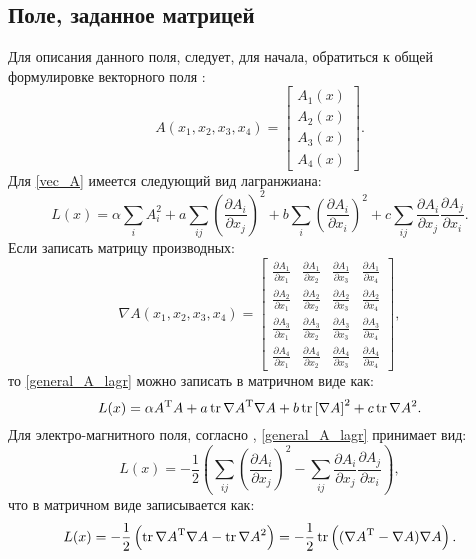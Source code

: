 \subsection{Поле, заданное матрицей}
Для описания данного поля, следует, для начала, обратиться к общей формулировке векторного поля \cite{field_theory}:
\begin{equation}
	A(x_1, x_2, x_3, x_4) = \begin{bmatrix} A_1(x) \\ A_2(x) \\ A_3(x) \\ A_4(x) \end{bmatrix}.
	\label{vec_A}
\end{equation}
Для \ref{vec_A} имеется следующий вид лагранжиана:
\begin{equation}
	L(x) = \alpha\sum_{i}A^2_i + a\sum_{ij}{\left(\frac{\partial A_i}{\partial x_j}\right)}^2 + b\sum_{i}{\left(\frac{\partial A_i}{\partial x_i}\right)}^2 + c\sum_{ij}\frac{\partial A_i}{\partial x_j}\frac{\partial A_j}{\partial x_i}. 
	\label{general_A_lagr}
\end{equation}
Если записать матрицу производных:
\begin{equation}
	\nabla A(x_1, x_2, x_3, x_4) = \begin{bmatrix}
	\frac{\partial A_1}{\partial x_1} & \frac{\partial A_1}{\partial x_2} & \frac{\partial A_1}{\partial x_3} & \frac{\partial A_1}{\partial x_4} \\
	\frac{\partial A_2}{\partial x_1} & \frac{\partial A_2}{\partial x_2} & \frac{\partial A_2}{\partial x_3} & \frac{\partial A_2}{\partial x_4} \\
	\frac{\partial A_3}{\partial x_1} & \frac{\partial A_3}{\partial x_2} & \frac{\partial A_3}{\partial x_3} & \frac{\partial A_3}{\partial x_4} \\
	\frac{\partial A_4}{\partial x_1} & \frac{\partial A_4}{\partial x_2} & \frac{\partial A_4}{\partial x_3} & \frac{\partial A_4}{\partial x_4}
 \end{bmatrix},
	\label{dA}
\end{equation}
то \ref{general_A_lagr} можно записать в матричном виде как:
\begin{equation}
	L(x) = \alpha A^\mathrm{T}A + a\operatorname{tr}{\nabla A}^\mathrm{T}\nabla A + b\operatorname{tr}{\left[\nabla A\right]}^2 + c\operatorname{tr}{\nabla A}^2.
	\label{mtrx_A_lagr}
\end{equation}
Для электро-магнитного поля, согласно \cite{field_theory}, \ref{general_A_lagr} принимает вид:
\begin{equation}
	L(x) = -\frac{1}{2}\left(\sum_{ij}{\left(\frac{\partial A_i}{\partial x_j}\right)}^2 - \sum_{ij}\frac{\partial A_i}{\partial x_j}\frac{\partial A_j}{\partial x_i}\right), 
	\label{general_electro_lagr}
\end{equation}
что в матричном виде записывается как:
\begin{equation}
	L(x) = -\frac{1}{2}\left(\operatorname{tr}{\nabla A}^\mathrm{T}\nabla A - \operatorname{tr}{\nabla A}^2\right) = -\frac{1}{2}\operatorname{tr}\left(({\nabla A}^\mathrm{T} - \nabla A)\nabla A\right).
	\label{mtrx_electro_lagr}
\end{equation}

